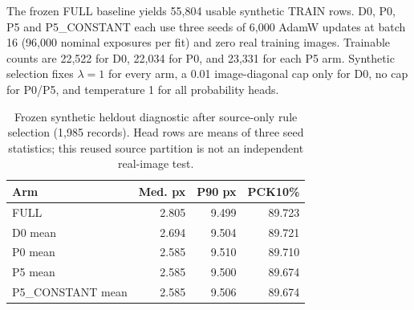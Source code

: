 The frozen FULL baseline yields 55,804 usable synthetic TRAIN rows. D0, P0, P5 and P5\_CONSTANT each use three seeds of 6,000 AdamW updates at batch 16 (96,000 nominal exposures per fit) and zero real training images. Trainable counts are 22,522 for D0, 22,034 for P0, and 23,331 for each P5 arm. Synthetic selection fixes $\lambda=1$ for every arm, a 0.01 image-diagonal cap only for D0, no cap for P0/P5, and temperature 1 for all probability heads.
\begin{table}[t]\centering\small
\caption{Frozen synthetic heldout diagnostic after source-only rule selection (1,985 records). Head rows are means of three seed statistics; this reused source partition is not an independent real-image test.}\label{tab:resnetsource}
\begin{tabular}{lrrr}\toprule
Arm & Med. px & P90 px & PCK10\%\\\midrule
FULL & 2.805 & 9.499 & 89.723\\
D0 mean & 2.694 & 9.504 & 89.721\\
P0 mean & 2.585 & 9.510 & 89.710\\
P5 mean & 2.585 & 9.500 & 89.674\\
P5\_CONSTANT mean & 2.585 & 9.506 & 89.674\\
\bottomrule\end{tabular}
\end{table}
